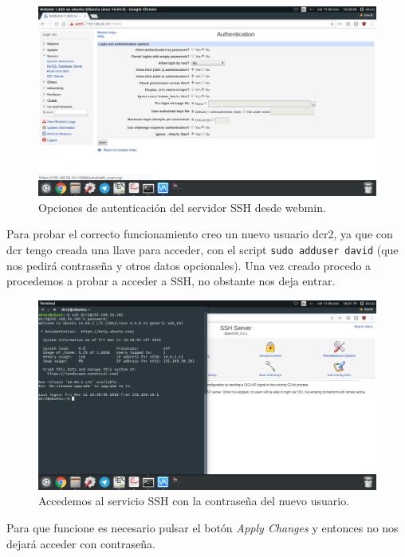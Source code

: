 \begin{flushleft}
\begin{figure}[H]
	\centering
	\includegraphics[scale=0.3]{webmin2.png}
	\caption{Opciones de autenticación del servidor SSH desde webmin.}
\end{figure}

Para probar el correcto funcionamiento creo un nuevo usuario dcr2, ya que con dcr tengo creada una llave para acceder, con el script \verb|sudo adduser david| (que nos pedirá contraseña y otros datos opcionales). Una vez creado procedo a procedemos a probar a acceder a SSH, no obstante nos deja entrar.

\begin{figure}[H]
	\centering
	\includegraphics[scale=0.3]{webmin3.png}
	\caption{Accedemos al servicio SSH con la contraseña del nuevo usuario.}
\end{figure}

Para que funcione es necesario pulsar el botón \textit{Apply Changes} y entonces no nos dejará acceder con contraseña.


\end{flushleft}
